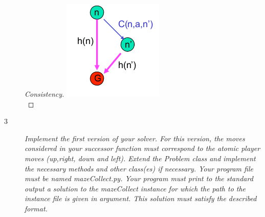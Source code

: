 \begin{description}
\begin{proof}[Consistency]
\includegraphics[scale=0.8]{consis.png}\\
\end{proof}


\item [3] \textit{Implement the first version of your solver. For this version, the moves considered in your successor function must correspond to the atomic player moves (up,right, down and left). Extend the Problem class and implement the necessary methods and other class(es) if necessary. Your program file must be named mazeCollect.py. Your program must print to the standard output a solution to the mazeCollect instance for which the path to the instance file is given in argument. This solution must satisfy the described format.} \\

\end{description}
 
